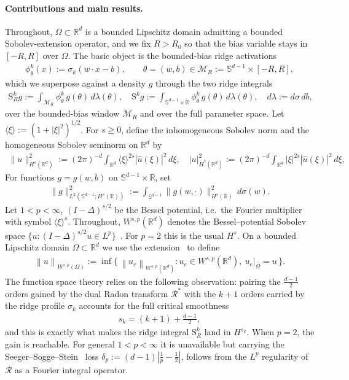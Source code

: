 \documentclass[12pt]{article}
\numberwithin{equation}{section}
\numberwithin{figure}{section}
\numberwithin{equation}{section}
\newcommand{\R}{\mathbb{R}}
\newcommand{\Sph}{\mathbb S}
\newcommand{\MR}{\mathcal M_R}
\newcommand{\norm}[1]{\left\|#1\right\|}
\newcommand{\abs}[1]{\left|#1\right|}
\begin{document}
\paragraph{Contributions and main results.}
Throughout, $\Omega\subset\R^d$ is a bounded Lipschitz domain admitting a bounded
Sobolev-extension operator, and we fix $R>R_0$ so that the
bias variable stays in $[-R,R]$ over $\Omega$. The basic object is the
bounded-bias ridge activations
\begin{align*}
    \phi^k_\theta(x):=\sigma_k(w\cdot x-b),
    \qquad \theta=(w,b)\in\MR:=\Sph^{d-1}\times[-R,R],
\end{align*}
which we superpose against a density $g$ through the two ridge integrals
\begin{align*}
    \mathrm{S}^k_R g:=\int_{\MR}\phi^k_\theta\,g(\theta)\,d\lambda(\theta),
    \quad
    \mathrm{S}^k g:=\int_{\Sph^{d-1}\times\R}\phi^k_\theta\,g(\theta)\,d\lambda(\theta), \quad d\lambda:=d\sigma\,db,
\end{align*}
over the bounded-bias window $\MR$ and over the full parameter space.
Let $\langle \xi\rangle := (1+|\xi|^2)^{1/2}$. For $s \ge 0$, define
the inhomogeneous Sobolev norm and the homogeneous Sobolev seminorm on $\mathbb R^d$ by
\begin{align*}
    \|u\|_{H^s(\mathbb R^d)}^2
    := (2\pi)^{-d}\int_{\mathbb R^d} \langle \xi\rangle^{2s} |\widehat u(\xi)|^2\,d\xi, \quad
    |u|_{\dot H^s(\mathbb R^d)}^2
    := (2\pi)^{-d}\int_{\mathbb R^d} |\xi|^{2s} |\widehat u(\xi)|^2\,d\xi ,
\end{align*}
For functions $g=g(w,b)$ on $\mathbb S^{d-1}\times\mathbb R$, set
\begin{align*}
    \|g\|_{L^2(\mathbb S^{d-1};H^s(\mathbb R))}^2
    := \int_{\mathbb S^{d-1}}
        \|g(w,\cdot)\|_{H^s(\mathbb R)}^2\,d\sigma(w).
\end{align*}
Let $1<p<\infty$, $(I-\Delta)^{s/2}$ be the Bessel potential,
i.e.\ the Fourier multiplier with symbol $\langle\xi\rangle^{s}$.
Throughout, $W^{s,p}(\mathbb R^d)$ denotes the Bessel--potential Sobolev space
$\{u:(I-\Delta)^{s/2}u\in L^p\}$~\cite{stein_harmonicanalysis_1993,triebel2008function}.
For $p=2$ this is the usual $H^s$.
On a bounded Lipschitz domain $\Omega\subset\R^d$ we use the 
extension~\cite{adams_SobolevSpaces_2008} to define
\begin{align*}
     \norm{u}_{W^{s,p}(\Omega)}
    :=\inf\bigl\{\,\norm{u_e}_{W^{s,p}(\R^d)}:u_e\in W^{s,p}(\R^d),\ u_e|_\Omega=u\,\bigr\}.
\end{align*}
The function space theory relies on the following observation: pairing the
$\tfrac{d-1}{2}$ orders gained by the dual Radon transform $\mathcal R^*$ with
the $k+1$ orders carried by the ridge profile $\sigma_k$ accounts for the full
critical smoothness
\begin{align*}
    s_k=(k+1)+\tfrac{d-1}{2},
\end{align*}
and this is exactly what makes the ridge integral $\mathrm{S}^k_R$ land in $H^{s_k}$. 
When $p=2$, the gain is reachable. For general $1<p<\infty$ it 
is unavailable but carrying the
Seeger--Sogge--Stein~\cite{seeger1991regularity} loss $\delta_p:=(d-1)\abs{\frac1p-\frac12}$,
follows from the $L^p$ regularity of
$\mathcal R$ as a Fourier integral operator.
\end{document}
